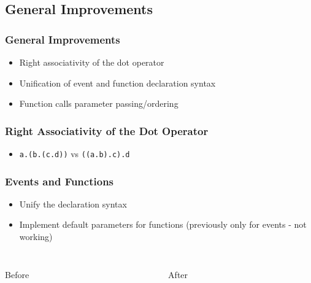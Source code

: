 \documentclass[aspectratio=169]{beamer}
\begin{document}
\subsection{General Improvements}
\begin{frame}
\frametitle{General Improvements}
\begin{itemize}
    \item Right associativity of the dot operator
    \item Unification of event and function declaration syntax
    \item Function calls parameter passing/ordering
\end{itemize}
\end{frame}

\begin{frame}
\frametitle{Right Associativity of the Dot Operator}
\begin{itemize}
    \item \texttt{a.(b.(c.d))} vs \texttt{((a.b).c).d}
\end{itemize}
\end{frame}

\begin{frame}
\frametitle{Events and Functions}
\begin{itemize}
    \item Unify the declaration syntax
    \item Implement default parameters for functions (previously only for events - not working)
\end{itemize}
    \begin{columns}
        \begin{column}{0.5\textwidth}
	        \inputminted[fontsize=\small]{swift}{code/events-before.flint}
	        \centering Before
        \end{column}
        \begin{column}{0.5\textwidth}
	        \inputminted[fontsize=\small]{swift}{code/events-after.flint}
	        \centering After
        \end{column}
    \end{columns}
\end{frame}
\end{document}
